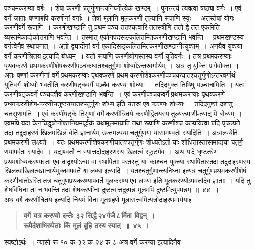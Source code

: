 \documentclass[11pt, openany]{book}
\begin{document}
\newpage

\begin{sloppypar}
\noindent पञ्चमकरण्या वर्गः~। शेषा करणी चतुर्गुणान्त्यनिघ्नीत्येकं खण्डम्~। पुनरन्त्यं त्यक्त्वा षष्ठ्या वर्गः~। एवं वर्गे जाताः षण्णामपि करणीनां वर्गाः~। तेषां मूलानि मूलकरणी तुल्यानि रूपाणि स्युः~। अतस्तेषां योगः करणीवर्गे रूपाणि~। करणीखण्डानि तु प्रथमं पञ्च ततश्चत्वारि ततस्त्रीणि ततो द्वे तत एकमिति व्यस्तमेकाद्येकोत्तराणि भवन्ति~। तस्मात् एकोनपदसङ्कलितमितकरणीखण्डानि भवन्ति~। प्रथमखण्डस्य वर्गत्वेनैव स्थापनात्~। अतो द्व्यादीनां वर्ग एकादिसङ्कलितमितकरणीखण्डानीत्युक्तम्~। अनयैव युक्त्या वर्गे करणीत्रितय इत्यादि बोध्यम्~। यतो रूपाणि करणीयोगस्तस्य वर्गो युतिवर्गः~। तत्र प्रथमकरण्याः पृथक्करणे प्रथमकरणीशेषकरणीपञ्चकघातश्चतुर्गुणः शोध्योऽन्तरवर्गार्थम्~। अत्र तु युक्तिः प्रागेवोक्ता~। अतः षण्णां करणीनां वर्गे प्रथमकरण्याः पृथक्करणे प्रथम-करणीशेषकरणीपञ्चकघातश्चतुर्गुणोऽन्तरवर्गार्थं युतिवर्गः शोध्यो भवतीति करणीषट्कवर्गे पञ्चैव करण्यः शोध्याः~। तदिदमुक्तं तिथिषु पञ्चानामिति~। यतः करणीषट्कवर्गे पञ्चदशैव करणीखण्डानि भवन्ति~। एवं करणीपञ्चकवर्गे प्रथमकरण्याः पृथक्करणे प्रथमकरणीशेष-करणीचतुष्टयघातश्चतुर्गुणः शोध्य इति चतस्र एव करण्यः शोध्याः~। तदिदमुक्तं दशसु चतसृणामति~। एवं करणीषट्के तिसृणां वर्गे करणीत्रितये करणीद्वितयस्य तुल्यरूपाणी-त्याद्यपि बोध्यम्~। एवमपि यदा केनचिद्धृष्टेनोक्तनियमपूर्वकं यथामूलमायाति तथा रूपाणि करणीश्च कल्पयित्वा यदि पृच्छ्यते तदा तदुदाहरणं खिलमखिलं वेति ज्ञानार्थम् उक्तमल्पया चतुर्गुणया यासामपवर्तः स्यादिति~। अत्राल्पयेति प्रथमकरणी लक्ष्यते~। यतः प्रथमकरणीशेषकरणीघातश्चतुर्गुणः शोध्यतेऽतो याः शोधितास्तासामाद्यया चतुर्गु-णयापर्वतः स्यादेव~। यद्यपवर्तो न स्यात्तदोदाहरणस्य खिलत्वं स्फुटमेव~। अथ यदि धृष्टतरेण प्रथमशोध्यकरण्यस्ता एव तादृश्योऽन्या वा स्थापिताः परतस्तु याः काश्चन युक्त्या स्थापितास्तदा तदुदाहरणस्य खिलत्वाखिलत्वज्ञानार्थमुक्तमपवर्ते या लब्धा इत्यादि~। यतश्चतुर्गुणान्त्यनिघ्ना इत्यत्र चतुर्गुणप्रथमकरणीशेषं करणीघातोऽस्ति तत्र चतुर्गुणप्रथकरण्यापवर्ते मूलकरण्य एव लभ्या इति मूलकरण्योऽपवर्तादेव ज्ञाताः~। यदि तु शेषविधिना ता न भवन्ति तदा शेषकरणीनां दुष्टत्वात्तदुत्पन्नं मूलमपि दुष्टमित्युपपन्नम्~॥~४४~॥\\

{\small अथ वर्गे करणीत्रितय इत्यादि नियमं विना मूलग्रहणे मूलासत्त्वमित्यत्रोदाहरणमार्ययाह\textendash }

 \label{4.45}
\begin{quote}
{\large \textbf{{\color{purple}वर्गे यत्र करण्यो दन्तैः ३२ सिद्धै\textendash \,२४\textendash \,र्गजै\textendash \,८\textendash \,र्मिता विद्वन्~।\\
रूपैर्दशाभिरुपेताः किं मूलं ब्रूहि तस्य स्यात्~॥~४५~॥}}}
\end{quote}

स्पष्टोऽर्थः~। न्यासो रू १० क ३२ क २४ क ८ अत्र वर्गे करण्या इत्यादिनैव
\end{sloppypar}
\end{document}
